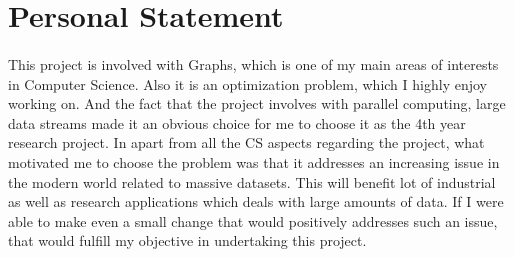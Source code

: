\section{Personal Statement}

\paragraph{}
This project is involved with Graphs, which is one of my main areas of 
interests in Computer Science. Also it is an optimization problem, which 
I highly enjoy working on. And the fact that the project involves with 
parallel computing, large data streams made it an obvious choice for me 
to choose it as the 4th year research project. In apart from all the CS 
aspects regarding the project, what motivated me to choose the problem 
was that it addresses an increasing issue in the modern world related to 
massive datasets. This will benefit lot of industrial as well as research 
applications which deals with large amounts of data. If I were able to make 
even a small change that would positively addresses such an issue, that would 
fulfill my objective in undertaking this project.